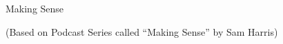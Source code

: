\begin{frame}[fragile]\frametitle{}
\begin{center}
{\Large Making Sense}


{\tiny (Based on Podcast Series called ``Making Sense'' by Sam Harris)}
\end{center}
\end{frame}







